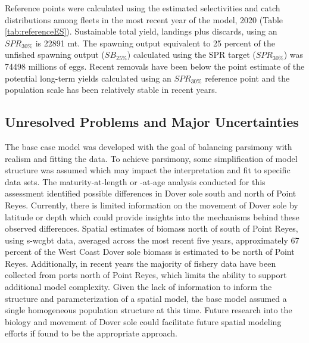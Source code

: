 \documentclass[11pt,
  english,
  a4paper,
]{article}
\begin{document}
Reference points were calculated using the estimated selectivities and catch distributions among fleets in the most recent year of the model, 2020 (Table \ref{tab:referenceES}). Sustainable total yield, landings plus discards, using an {\(SPR_{30\%}\)\leavevmode\tagmcend\tagstructend} is 22891 mt. The spawning output equivalent to 25 percent of the unfished spawning output ({\(SB_{25\%}\)\leavevmode\tagmcend\tagstructend}) calculated using the SPR target ({\(SPR_{30\%}\)\leavevmode\tagmcend\tagstructend}) was 74498 millions of eggs. Recent removals have been below the point estimate of the potential long-term yields calculated using an {\(SPR_{30\%}\)\leavevmode\tagmcend\tagstructend} reference point and the population scale has been relatively stable in recent years.

\leavevmode\tagmcend\tagstructend\par


\hypertarget{unresolved-problems-and-major-uncertainties-1}{%
\subsection{Unresolved Problems and Major Uncertainties}\label{unresolved-problems-and-major-uncertainties-1}}

\leavevmode\tagmcend\tagstructend


The base case model was developed with the goal of balancing parsimony with realism and fitting the data. To achieve parsimony, some simplification of model structure was assumed which may impact the interpretation and fit to specific data sets. The maturity-at-length or -at-age analysis conducted for this assessment identified possible differences in Dover sole south and north of Point Reyes. Currently, there is limited information on the movement of Dover sole by latitude or depth which could provide insights into the mechanisms behind these observed differences. Spatial estimates of biomass north of south of Point Reyes, using \gls{s-wcgbt} data, averaged across the most recent five years, approximately 67 percent of the West Coast Dover sole biomass is estimated to be north of Point Reyes. Additionally, in recent years the majority of fishery data have been collected from ports north of Point Reyes, which limits the ability to support additional model complexity. Given the lack of information to inform the structure and parameterization of a spatial model, the base model assumed a single homogeneous population structure at this time. Future research into the biology and movement of Dover sole could facilitate future spatial modeling efforts if found to be the appropriate approach.
\end{document}
